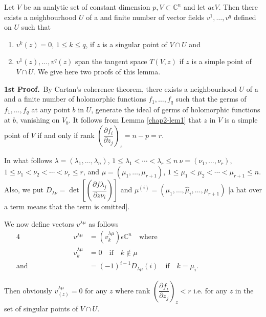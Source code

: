 \begin{lemma}[Whitney]\label{chap2-lem5} %
  Let $V$ be an analytic set of constant
  dimension $p, V \subset \mathbb{C}^n$ and let $a \epsilon V$. Then
  there exists a neighbourhood $U$ of a and finite number of vector
  fields $v^1,\ldots,v^q$ defined on $U$ such that 
  \begin{enumerate}[\rm(i)]
  \item $v^k(z) = 0$, $1 \leq k \leq q$, if $z$ is a singular point of
    $V \cap U$ and 
  \item $v^1(z),\ldots, v^q(z)$ span the tangent space $T(V,z)$ if $z$
    is a simple point of $V\cap U$. We give here two proofs of this
    lemma. 
  \end{enumerate}
\end{lemma}

\noindent
\textbf{1st Proof.}\, By Cartan's coherence theorem, there exists a
neighbourhood $U$ of a and a finite number of holomorphic functions
$f_1,\ldots,f_q$ such that the germs of $f_1,\ldots,f_q$ at any point
$b$ in $U$, generate the ideal of germs of holomorphic functions at $b$,
vanishing on $V_b$. It follows from Lemma \ref{chap2-lem1} that $z$ in $V$ is a
simple point of $V$ if and only if rank $\left(\dfrac{\partial
  f_i}{\partial z_j}\right)_z = n - p = r$.\pageoriginale 

In what follows $\lambda=(\lambda_1,\ldots, \lambda_n)$, $1 \leq
\lambda_1 < \cdots < \lambda_r \leq n~ \nu = (\nu_1,\ldots, \nu_r)$, $1
\leq \nu_{1} < \nu_2 < \cdots < \nu_r \leq r$, and $\mu=(\mu_1,\ldots,
\mu_{r+1})$, $1\leq \mu_1 < \mu_2 < \cdots < \mu_{r+1} \leq n$. Also, we put
$D_{\lambda \nu} = \det \left[\left(\dfrac{\partial f \lambda_j}{\partial z
    \nu_i}\right)\right]$ and $\mu^{(i)} = (\mu_1,\ldots,\hat{\mu}_i,\ldots,
\mu_{r+1})$ [a hat over a term means that the term is omitted]. 

We now define vectors $v^{\lambda \mu}$ as follows
\begin{alignat*}{4}
  &&v^{\lambda \mu} & = (v_k^{\lambda \mu})\epsilon \mathbb{C}^n
  \quad\text{where}\\ 
  &&v^{\lambda \mu}_k & = 0\quad\text{if}\quad k \notin \mu\\
  \text{and} &\hspace{2cm}& & = (-1)^{i-1} D_{\lambda
    \mu}(i)\quad\text{if}\quad k = \mu_i.\hspace{3cm} 
\end{alignat*}

Then obviously $v_{(z)}^{\lambda \mu}  = 0$ for any $z$ where rank
$\left(\dfrac{\partial f_i}{\partial z_j}\right)_z < r$ i.e. for any $z$ in the
set of singular points of $V \cap U$.  


